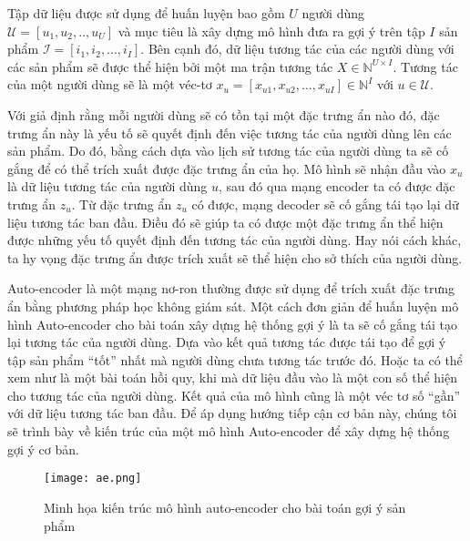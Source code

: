 

   Tập dữ liệu được sử dụng để huấn luyện bao gồm $U$ người dùng $\mathcal{U} = [u_1,u_2, .., u_U]$ và mục tiêu là xây dựng mô hình đưa ra gợi ý trên tập $I$ sản phẩm $\mathcal{I} = [i_1,i_2, ..., i_I]$. 
    Bên cạnh đó, dữ liệu tương tác của các người dùng với các sản phẩm sẽ được thể hiện bởi một ma trận tương tác $X \in \mathbb{N}^{U\times I}$. 
    Tương tác của một người dùng sẽ là một véc-tơ $x_u = [x_{u1}, x_{u2}, ..., x_{uI}] \in \mathbb{N}^I $ với $u \in \mathcal{U}$.
    
    Với giả định rằng mỗi người dùng sẽ có tồn tại một đặc trưng ẩn nào đó, đặc trưng ẩn này là yếu tố sẽ quyết định đến việc tương tác của người dùng lên các sản phẩm.
    Do đó, bằng cách dựa vào lịch sử tương tác của người dùng ta sẽ cố gắng để có thể trích xuất được đặc trưng ẩn của họ.
    Mô hình sẽ nhận đầu vào $x_u$ là dữ liệu tương tác của người dùng $u$, sau đó qua mạng encoder ta có được đặc trưng ẩn $z_u$.
    Từ đặc trưng ẩn $z_u$ có được, mạng decoder sẽ cố gắng tái tạo lại dữ liệu tương tác ban đầu.
    Điều đó sẽ giúp ta có được một đặc trưng ẩn thể hiện được những yếu tố quyết định đến tương tác của người dùng.
    Hay nói cách khác, ta hy vọng đặc trưng ẩn được trích xuất sẽ thể hiện cho sở thích của người dùng. 

    Auto-encoder là một mạng nơ-ron thường được sử dụng để trích xuất đặc trưng ẩn bằng phương pháp học không giám sát.
    Một cách đơn giản để huấn luyện mô hình Auto-encoder cho bài toán xây dựng hệ thống gợi ý là ta sẽ cố gắng tái tạo lại tương tác của người dùng.
    Dựa vào kết quả tương tác được tái tạo để gợi ý tập sản phẩm ``tốt'' nhất mà người dùng chưa tương tác trước đó. 
    Hoặc ta có thể xem như là một bài toán hồi quy, khi mà dữ liệu đầu vào là một con số thể hiện cho tương tác của người dùng.
    Kết quả của mô hình cũng là một véc tơ số ``gần'' với dữ liệu tương tác ban đầu.  
    Để áp dụng hướng tiếp cận cơ bản này, chúng tôi sẽ trình bày về kiến trúc của một mô hình Auto-encoder để xây dựng hệ thống gợi ý cơ bản.
    \begin{figure}
        \centering
        \texttt{[image: ae.png]}
        \caption{Minh họa kiến trúc mô hình auto-encoder cho bài toán gợi ý sản phẩm}
        \label{fig_recae}
    \end{figure}

